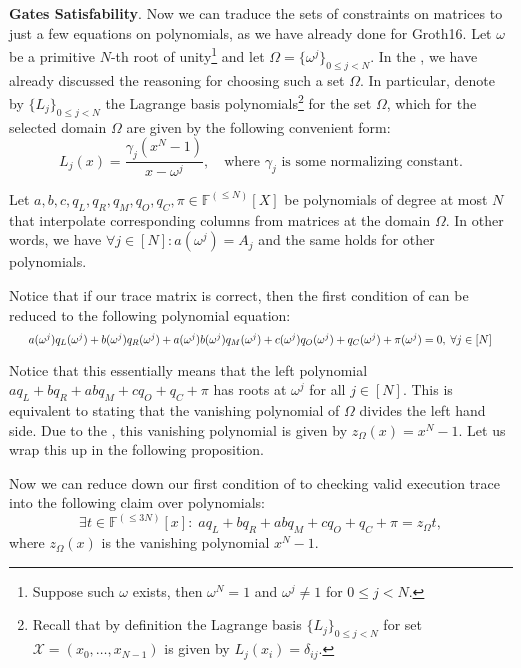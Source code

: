 \documentclass[../lecture-notes-148x210.tex]{subfiles}
\begin{document}
\textcolor{blue!80!black}{\textbf{Gates Satisfability}.} Now we can traduce the
sets of constraints on matrices to just a few equations on polynomials, as we
have already done for Groth16. Let $\omega$ be a primitive $N$-th root of
unity\footnote{Suppose such $\omega$ exists, then $\omega^N = 1$ and $\omega^j
\neq 1$ for $0 \le j < N$.} and let $\Omega = \{\omega^j\}_{0 \leq j < N}$. In
the , we have already discussed the reasoning for choosing
such a set $\Omega$. In particular, denote by $\{L_j\}_{0 \leq j < N}$ the
Lagrange basis polynomials\footnote{Recall that by definition the Lagrange basis
$\{L_j\}_{0 \leq j < N}$ for set $\mathcal{X}=(x_0,\dots,x_{N-1})$ is given by
$L_j(x_i) = \delta_{ij}$.} for the set $\Omega$, which for the selected domain
$\Omega$ are given by the following convenient form:
\begin{equation*}
    L_j(x) = \frac{\gamma_j(x^N - 1)}{x-\omega^j}, \quad \text{where $\gamma_j$ is some normalizing constant.}
\end{equation*}

Let $a, b, c, q_L, q_R, q_M, q_O, q_C, \pi \in \mathbb{F}^{(\leq N)}[X]$ be
polynomials of degree at most $N$ that interpolate corresponding columns from
matrices at the domain $\Omega$. In other words, we have \(\forall j \in [N]:
a(\omega^j) = A_j\) and the same holds for other polynomials.

Notice that if our trace matrix is correct, then the first condition of
 can be reduced to the following polynomial
equation:
\begin{equation*}
    \scalebox{0.8}{$
        a(\omega^j)q_L(\omega^j) + b(\omega^j)q_R(\omega^j) + a(\omega^j)b(\omega^j)q_M(\omega^j) + c(\omega^j)q_O(\omega^j) + q_C(\omega^j) + \pi(\omega^j) = 0, \; \forall j \in [N]
    $}
\end{equation*}

Notice that this essentially means that the left polynomial $aq_L + bq_R + abq_M
+ cq_O + q_C + \pi$ has roots at $\omega^j$ for all $j \in [N]$. This is
equivalent to stating that the vanishing polynomial of $\Omega$ divides the left
hand side. Due to the , this vanishing
polynomial is given by $z_{\Omega}(x) = x^N-1$.  Let us wrap this up in the
following proposition.

\begin{proposition}
    Now we can reduce down our first condition of 
    to checking valid execution trace into the following claim over polynomials:
    \[\exists t \in \mathbb{F}^{(\leq 3N)}[x]: \; aq_L + bq_R + abq_M + cq_O + q_C + \pi = z_{\Omega}t,\]
    where $z_{\Omega}(x)$ is the vanishing polynomial $x^N - 1$.
\end{proposition}
\end{document}
